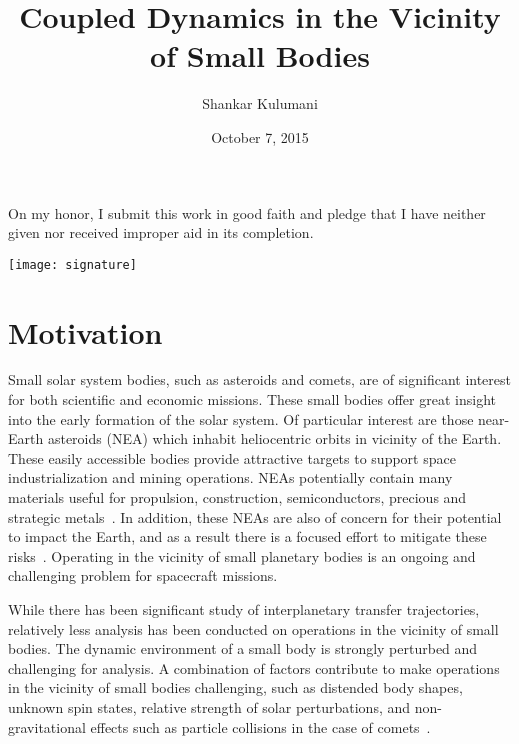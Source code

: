 \documentclass[11pt]{article} %
\title{Coupled Dynamics in the Vicinity of Small Bodies}
\author{Shankar Kulumani}
\date{October 7, 2015}
\begin{document}
\makeatletter
\begin{titlepage}
	\centering
	\LARGE{\@title \par} 
	\vspace{1cm}
	\Large{\@date \par}
	\vfill
	\Large{On my honor, I submit this work in good faith and pledge that I have neither given nor received improper aid in its completion. \par}
	\vspace{1cm}
	\Large{\@author \par}
	\vspace{1cm}
	\texttt{[image: signature]}\\
	\vspace{-0.5cm}
	\makebox[2.5in]{\hrulefill}
\end{titlepage}
\makeatother
\section{Motivation}

Small solar system bodies, such as asteroids and comets, are of significant interest for both scientific and economic missions.
These small bodies offer great insight into the early formation of the solar system.
Of particular interest are those near-Earth asteroids (NEA) which inhabit heliocentric orbits in vicinity of the Earth.
These easily accessible bodies provide attractive targets to support space industrialization and mining operations.
NEAs potentially contain many materials useful for propulsion, construction, semiconductors, precious and strategic metals~\cite{ross2001}.
In addition, these NEAs are also of concern for their potential to impact the Earth, and as a result there is a focused effort to mitigate these risks~\cite{wie2008}.
Operating in the vicinity of small planetary bodies is an ongoing and challenging problem for spacecraft missions.

While there has been significant study of interplanetary transfer trajectories, relatively less analysis has been conducted on operations in the vicinity of small bodies.
The dynamic environment of a small body is strongly perturbed and challenging for analysis.
A combination of factors contribute to make operations in the vicinity of small bodies challenging, such as distended body shapes, unknown spin states, relative strength of solar perturbations, and non-gravitational effects such as particle collisions in the case of comets~\cite{scheeres2012}.
\end{document}
